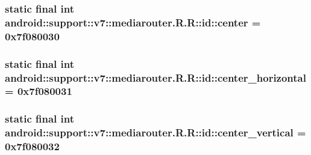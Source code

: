 \hypertarget{classandroid_1_1support_1_1v7_1_1mediarouter_1_1_r_1_1id_6f1df9eee45aa65104eb9a432623b998}{
\subsubsection[{center}]{\setlength{\rightskip}{0pt plus 5cm}static final int android::support::v7::mediarouter.R.R::id::center = 0x7f080030}}
\label{classandroid_1_1support_1_1v7_1_1mediarouter_1_1_r_1_1id_6f1df9eee45aa65104eb9a432623b998}


\hypertarget{classandroid_1_1support_1_1v7_1_1mediarouter_1_1_r_1_1id_9ccbc54b131e7f8887feeff2a162eae2}{
\subsubsection[{center\_\-horizontal}]{\setlength{\rightskip}{0pt plus 5cm}static final int android::support::v7::mediarouter.R.R::id::center\_\-horizontal = 0x7f080031}}
\label{classandroid_1_1support_1_1v7_1_1mediarouter_1_1_r_1_1id_9ccbc54b131e7f8887feeff2a162eae2}


\hypertarget{classandroid_1_1support_1_1v7_1_1mediarouter_1_1_r_1_1id_c28d3c7ab28c1f7a7b5dada58ac6138c}{
\subsubsection[{center\_\-vertical}]{\setlength{\rightskip}{0pt plus 5cm}static final int android::support::v7::mediarouter.R.R::id::center\_\-vertical = 0x7f080032}}
\label{classandroid_1_1support_1_1v7_1_1mediarouter_1_1_r_1_1id_c28d3c7ab28c1f7a7b5dada58ac6138c}


